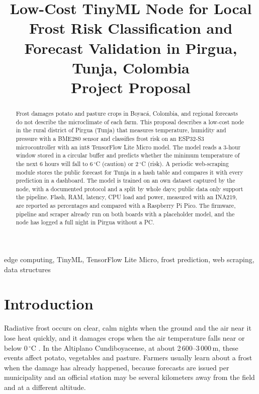 \documentclass[conference]{IEEEtran}
\begin{document}
\title{Low-Cost TinyML Node for Local Frost Risk Classification and Forecast Validation in Pirgua, Tunja, Colombia\\
{\large Project Proposal}}

\author{
}

\maketitle

\begin{abstract}
Frost damages potato and pasture crops in Boyac\'a, Colombia, and regional forecasts do not describe the microclimate of each farm. This proposal describes a low-cost node in the rural district of Pirgua (Tunja) that measures temperature, humidity and pressure with a BME280 sensor and classifies frost risk on an ESP32-S3 microcontroller with an int8 TensorFlow Lite Micro model. The model reads a 3-hour window stored in a circular buffer and predicts whether the minimum temperature of the next 6 hours will fall to 6\,$^\circ$C (caution) or 2\,$^\circ$C (risk). A periodic web-scraping module stores the public forecast for Tunja in a hash table and compares it with every prediction in a dashboard. The model is trained on an own dataset captured by the node, with a documented protocol and a split by whole days; public data only support the pipeline. Flash, RAM, latency, CPU load and power, measured with an INA219, are reported as percentages and compared with a Raspberry Pi Pico. The firmware, pipeline and scraper already run on both boards with a placeholder model, and the node has logged a full night in Pirgua without a PC.
\end{abstract}

\begin{IEEEkeywords}
edge computing, TinyML, TensorFlow Lite Micro, frost prediction, web scraping, data structures
\end{IEEEkeywords}

\section{Introduction}
Radiative frost occurs on clear, calm nights when the ground and the air near it lose heat quickly, and it damages crops when the air temperature falls near or below 0\,$^\circ$C \cite{fao_frost}. In the Altiplano Cundiboyacense, at about 2\,600--3\,000\,m, these events affect potato, vegetables and pasture. Farmers usually learn about a frost when the damage has already happened, because forecasts are issued per municipality and an official station may be several kilometers away from the field and at a different altitude.
\end{document}
